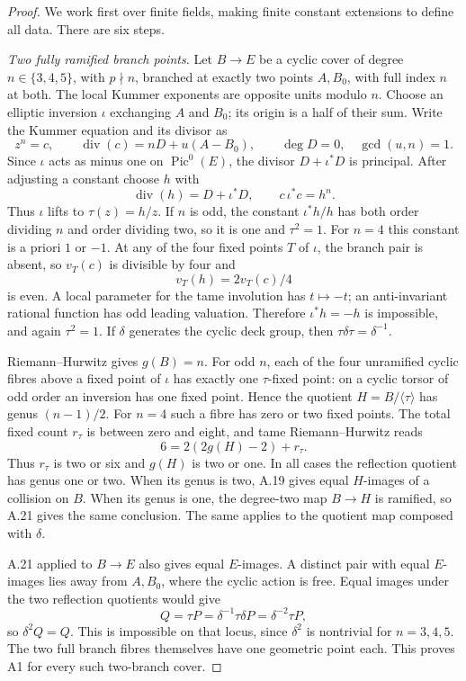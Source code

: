 \begin{proof}
We work first over finite fields, making finite constant
extensions to define all data. There are six steps.

\emph{Two fully ramified branch points.}
Let $B\to E$ be a cyclic cover of degree
$n\in\{3,4,5\}$, with $p\nmid n$, branched at exactly
two points $A,B_0$, with full index $n$ at both. The
local Kummer exponents are opposite units modulo $n$.
Choose an elliptic inversion $\iota$ exchanging $A$ and
$B_0$; its origin is a half of their sum. Write the
Kummer equation and its divisor as
\[
 z^n=c,\qquad
 \operatorname{div}(c)=nD+u(A-B_0),\qquad \deg D=0,
 \quad\gcd(u,n)=1.
\]
Since $\iota$ acts as minus one on
$\operatorname{Pic}^0(E)$, the divisor $D+\iota^*D$ is
principal. After adjusting a constant choose $h$ with
\[
 \operatorname{div}(h)=D+\iota^*D,
 \qquad c\,\iota^*c=h^n.
\]
Thus $\iota$ lifts to $\tau(z)=h/z$. If $n$ is odd, the
constant $\iota^*h/h$ has both order dividing $n$ and
order dividing two, so it is one and $\tau^2=1$.
For $n=4$ this constant is a priori $1$ or $-1$. At any
of the four fixed points $T$ of $\iota$, the branch pair
is absent, so $v_T(c)$ is divisible by four and
\[
 v_T(h)=2v_T(c)/4
\]
is even. A local parameter for the tame involution has
$t\mapsto-t$; an anti-invariant rational function has
odd leading valuation. Therefore $\iota^*h=-h$ is
impossible, and again $\tau^2=1$. If $\delta$ generates
the cyclic deck group, then
$\tau\delta\tau=\delta^{-1}$.

Riemann--Hurwitz gives $g(B)=n$. For odd $n$, each of
the four unramified cyclic fibres above a fixed point of
$\iota$ has exactly one $\tau$-fixed point: on a cyclic
torsor of odd order an inversion has one fixed point.
Hence the quotient $H=B/\langle\tau\rangle$ has genus
$(n-1)/2$. For $n=4$ such a fibre has zero or two fixed
points. The total fixed count $r_\tau$ is between zero
and eight, and tame Riemann--Hurwitz reads
\[
 6=2(2g(H)-2)+r_\tau.
\]
Thus $r_\tau$ is two or six and $g(H)$ is two or one.
In all cases the reflection quotient has genus one or
two. When its genus is two, A.19 gives equal $H$-images
of a collision on $B$. When its genus is one, the
degree-two map $B\to H$ is ramified, so A.21 gives the
same conclusion. The same applies to the quotient map
composed with $\delta$.

A.21 applied to $B\to E$ also gives equal $E$-images.
A distinct pair with equal $E$-images lies away from
$A,B_0$, where the cyclic action is free. Equal images
under the two reflection quotients would give
\[
 Q=\tau P=\delta^{-1}\tau\delta P
              =\delta^{-2}\tau P,
\]
so $\delta^2 Q=Q$. This is impossible on that locus,
since $\delta^2$ is nontrivial for $n=3,4,5$. The two
full branch fibres themselves have one geometric point
each. This proves A1 for every such two-branch cover.


\end{proof}
